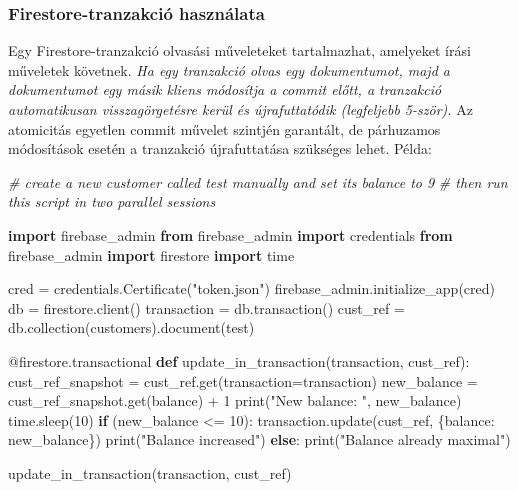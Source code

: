 \documentclass[
  magyar,
]{article}
\newenvironment{Shaded}{}{}
\newcommand{\AttributeTok}[1]{\textcolor[rgb]{0.49,0.56,0.16}{#1}}
\newcommand{\BuiltInTok}[1]{\textcolor[rgb]{0.00,0.50,0.00}{#1}}
\newcommand{\CommentTok}[1]{\textcolor[rgb]{0.38,0.63,0.69}{\textit{#1}}}
\newcommand{\ControlFlowTok}[1]{\textcolor[rgb]{0.00,0.44,0.13}{\textbf{#1}}}
\newcommand{\DecValTok}[1]{\textcolor[rgb]{0.25,0.63,0.44}{#1}}
\newcommand{\ImportTok}[1]{\textcolor[rgb]{0.00,0.50,0.00}{\textbf{#1}}}
\newcommand{\KeywordTok}[1]{\textcolor[rgb]{0.00,0.44,0.13}{\textbf{#1}}}
\newcommand{\NormalTok}[1]{#1}
\newcommand{\OperatorTok}[1]{\textcolor[rgb]{0.40,0.40,0.40}{#1}}
\newcommand{\StringTok}[1]{\textcolor[rgb]{0.25,0.44,0.63}{#1}}
\begin{document}
\subsubsection{Firestore-tranzakció
használata}\label{firestore-tranzakciuxf3-hasznuxe1lata}

Egy Firestore-tranzakció olvasási műveleteket tartalmazhat, amelyeket
írási műveletek követnek. \emph{Ha egy tranzakció olvas egy
dokumentumot, majd a dokumentumot egy másik kliens módosítja a commit
előtt, a tranzakció automatikusan visszagörgetésre kerül és
újrafuttatódik (legfeljebb 5-ször).} Az atomicitás egyetlen commit
művelet szintjén garantált, de párhuzamos módosítások esetén a
tranzakció újrafuttatása szükséges lehet. Példa:

\begin{Shaded}
\begin{Highlighting}[]
\CommentTok{\# create a new customer called test manually and set its balance to 9}
\CommentTok{\# then run this script in two parallel sessions}

\ImportTok{import}\NormalTok{ firebase\_admin}
\ImportTok{from}\NormalTok{ firebase\_admin }\ImportTok{import}\NormalTok{ credentials}
\ImportTok{from}\NormalTok{ firebase\_admin }\ImportTok{import}\NormalTok{ firestore}
\ImportTok{import}\NormalTok{ time}

\NormalTok{cred }\OperatorTok{=}\NormalTok{ credentials.Certificate(}\StringTok{"token.json"}\NormalTok{)}
\NormalTok{firebase\_admin.initialize\_app(cred)}
\NormalTok{db }\OperatorTok{=}\NormalTok{ firestore.client()}
\NormalTok{transaction }\OperatorTok{=}\NormalTok{ db.transaction()}
\NormalTok{cust\_ref }\OperatorTok{=}\NormalTok{ db.collection(}\StringTok{\textquotesingle{}customers\textquotesingle{}}\NormalTok{).document(}\StringTok{\textquotesingle{}test\textquotesingle{}}\NormalTok{)}

\AttributeTok{@firestore.transactional}
\KeywordTok{def}\NormalTok{ update\_in\_transaction(transaction, cust\_ref):}
\NormalTok{  cust\_ref\_snapshot }\OperatorTok{=}\NormalTok{ cust\_ref.get(transaction}\OperatorTok{=}\NormalTok{transaction)}
\NormalTok{  new\_balance }\OperatorTok{=}\NormalTok{ cust\_ref\_snapshot.get(}\StringTok{\textquotesingle{}balance\textquotesingle{}}\NormalTok{) }\OperatorTok{+} \DecValTok{1}
  \BuiltInTok{print}\NormalTok{(}\StringTok{"New balance: "}\NormalTok{, new\_balance)}
\NormalTok{  time.sleep(}\DecValTok{10}\NormalTok{)}
  \ControlFlowTok{if}\NormalTok{ (new\_balance }\OperatorTok{\textless{}=} \DecValTok{10}\NormalTok{):}
\NormalTok{    transaction.update(cust\_ref, \{}\StringTok{\textquotesingle{}balance\textquotesingle{}}\NormalTok{: new\_balance\})}
    \BuiltInTok{print}\NormalTok{(}\StringTok{"Balance increased"}\NormalTok{)}
  \ControlFlowTok{else}\NormalTok{:}
    \BuiltInTok{print}\NormalTok{(}\StringTok{"Balance already maximal"}\NormalTok{)}

\NormalTok{update\_in\_transaction(transaction, cust\_ref)}
\end{Highlighting}
\end{Shaded}
\end{document}
